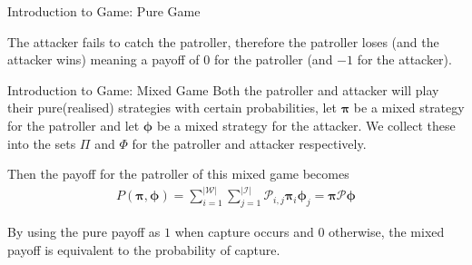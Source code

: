 \documentclass[11pt]{beamer}
\begin{document}
\begin{frame}{Introduction to Game: Pure Game}
\begin{center}

\end{center}
{
The attacker fails to catch the patroller, therefore the patroller loses (and the attacker wins) meaning a payoff of $0$ for the patroller (and $-1$ for the attacker).
}
\end{frame}

\hypertarget{Introduction to Game: Mixed Game}{}
\begin{frame}{Introduction to Game: Mixed Game}
Both the patroller and attacker will play their pure(realised) strategies with certain probabilities, let $\bm{\pi}$ be a mixed strategy for the patroller and let $\bm{\phi}$ be a mixed strategy for the attacker. We collect these into the sets $\Pi$ and $\Phi$ for the patroller and attacker respectively.

Then the payoff for the patroller of this mixed game becomes
\begin{align*}
P(\bm{\pi} ,\bm{\phi})=\sum\limits_{i=1}^{|\mathcal{W}|} \sum\limits_{j=1}^{|\mathcal{I}|} \mathcal{P}_{i,j} \bm{\pi} _{i} \bm{\phi}_{j}
=\bm{\pi} \mathcal{P} \bm{\phi}
\end{align*}

By using the pure payoff as $1$ when capture occurs and $0$ otherwise, the mixed payoff is equivalent to the probability of capture.
\end{frame}
\end{document}
